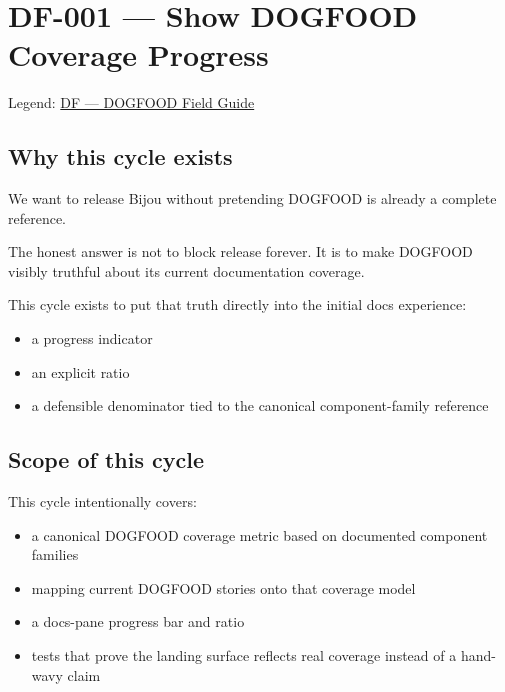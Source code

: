 \chapter{DF-001 --- Show DOGFOOD Coverage Progress}\label{record-064}

\smallskip

Legend: \href{https://github.com/flyingrobots/bijou/blob/1853ad902f6bf219326409e7f743a5a1d6517dbc/docs/legends/DF-dogfood-field-guide.md}{DF --- DOGFOOD Field Guide}

\section{Why this cycle exists}\label{record-064-why-this-cycle-exists}

We want to release Bijou without pretending DOGFOOD is already a complete reference.

The honest answer is not to block release forever. It is to make DOGFOOD visibly truthful about its current documentation coverage.

This cycle exists to put that truth directly into the initial docs experience:

\begin{itemize}
\tightlist
\item
  a progress indicator
\item
  an explicit ratio
\item
  a defensible denominator tied to the canonical component-family reference
\end{itemize}

\section{Scope of this cycle}\label{record-064-scope-of-this-cycle}

This cycle intentionally covers:

\begin{itemize}
\tightlist
\item
  a canonical DOGFOOD coverage metric based on documented component families
\item
  mapping current DOGFOOD stories onto that coverage model
\item
  a docs-pane progress bar and ratio
\item
  tests that prove the landing surface reflects real coverage instead of a hand-wavy claim
\end{itemize}


